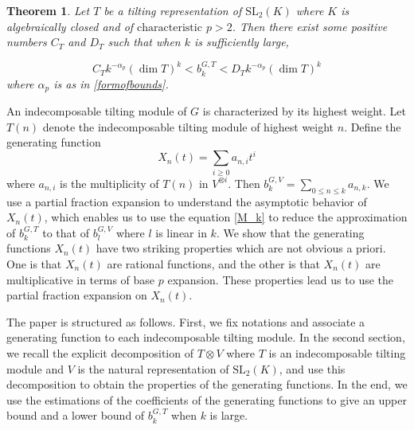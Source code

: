 \documentclass[11 pt]{amsart}
\theoremstyle{plain}
\newtheorem{thm}{Theorem}[section]
\theoremstyle{definition}
\theoremstyle{remark}
\def\SL{\text{SL}}
\def\xx{\otimes}
\def\ch{\text{characteristic}}
\begin{document}
\begin{thm}
    Let $T$ be a tilting representation of $\SL_2(K)$ where $K$ is algebraically closed and of $\ch$ $p>2$. Then there exist some positive numbers $C_T$ and $D_T$ such that when $k$ is sufficiently large, 

    \begin{equation} \label{main_ineq}
        C_Tk^{-\alpha_p} (\dim T)^k < b_k^{G, T}< D_T k^{-\alpha_p}(\dim T)^k    
    \end{equation}
    where $\alpha_p$ is as in \eqref{formofbounds}.     
\end{thm}

An indecomposable tilting module of $G$ is characterized by its highest weight. Let $T(n)$ denote the indecomposable tilting module of highest weight $n$. Define the generating function $$X_n(t)=\sum_{i\ge 0}a_{n, i}t^i$$ where $a_{n, i}$ is the multiplicity of $T(n)$ in $V^{\xx i}$. Then $b_k^{G, V}=\sum_{0 \le n \le k}a_{n, k}$.  We use a partial fraction expansion to understand the asymptotic behavior of $X_n(t)$, which enables us to use the equation \eqref{M_k} to reduce the approximation of $b_k^{G, T}$ to that of $b_l^{G, V}$ where $l$ is linear in $k$. We show that the generating functions $X_n(t)$ have two striking properties which are not obvious a priori. One is that $X_n(t)$ are rational functions, and the other is that  $X_n(t)$ are multiplicative in terms of base $p$ expansion. These properties lead us to use the partial fraction expansion on $X_n(t)$.








The paper is structured as follows. First, we fix notations and associate a generating function to each indecomposable tilting module.  In the second section, we recall the explicit decomposition of $T\xx V$ where $T$ is an indecomposable tilting module and $V$ is the natural representation of $\SL_2(K)$, and use this decomposition to obtain the properties of the generating functions. In the end, we use the estimations of the coefficients of the generating functions to give an upper bound and a lower bound of $b_k^{G, T}$ when $k$ is large.
\end{document}
